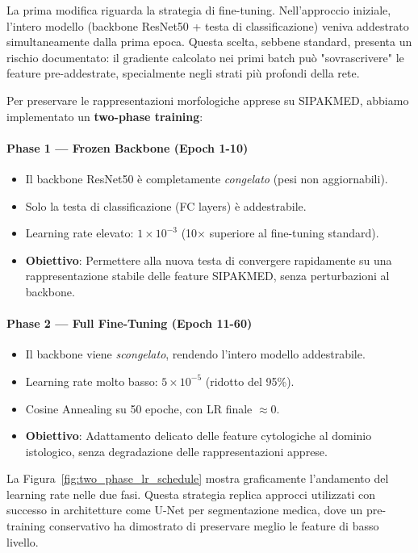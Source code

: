 	La prima modifica riguarda la strategia di fine-tuning. Nell'approccio iniziale, l'intero modello (backbone ResNet50 + testa di classificazione) veniva addestrato simultaneamente dalla prima epoca. Questa scelta, sebbene standard, presenta un rischio documentato: il gradiente calcolato nei primi batch può "sovrascrivere" le feature pre-addestrate, specialmente negli strati più profondi della rete.
	
	Per preservare le rappresentazioni morfologiche apprese su SIPAKMED, abbiamo implementato un \textbf{two-phase training}:
	
	\paragraph{Phase 1 — Frozen Backbone (Epoch 1-10)}
	\begin{itemize}
		\item Il backbone ResNet50 è completamente \textit{congelato} (pesi non aggiornabili).
		\item Solo la testa di classificazione (FC layers) è addestrabile.
		\item Learning rate elevato: $1 \times 10^{-3}$ (10× superiore al fine-tuning standard).
		\item \textbf{Obiettivo}: Permettere alla nuova testa di convergere rapidamente su una rappresentazione stabile delle feature SIPAKMED, senza perturbazioni al backbone.
	\end{itemize}
	
	\paragraph{Phase 2 — Full Fine-Tuning (Epoch 11-60)}
	\begin{itemize}
		\item Il backbone viene \textit{scongelato}, rendendo l'intero modello addestrabile.
		\item Learning rate molto basso: $5 \times 10^{-5}$ (ridotto del 95\%).
		\item Cosine Annealing su 50 epoche, con LR finale $\approx 0$.
		\item \textbf{Obiettivo}: Adattamento delicato delle feature cytologiche al dominio istologico, senza degradazione delle rappresentazioni apprese.
	\end{itemize}
	
	La Figura~\ref{fig:two_phase_lr_schedule} mostra graficamente l'andamento del learning rate nelle due fasi. Questa strategia replica approcci utilizzati con successo in architetture come U-Net per segmentazione medica, dove un pre-training conservativo ha dimostrato di preservare meglio le feature di basso livello.
	
